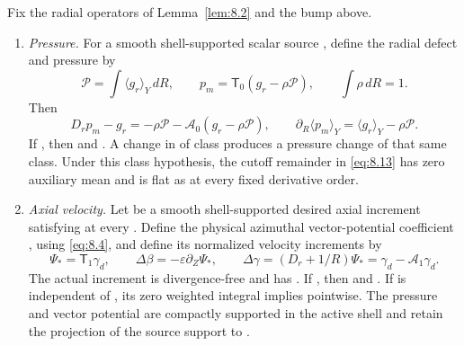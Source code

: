 \begin{proposition}\label{prop:8.3}
Fix the radial operators of Lemma~\ref{lem:8.2} and the bump  above.
%
\begin{enumerate}[label=(\roman*)]
\item \emph{Pressure.} For a smooth shell-supported scalar source
, define the radial defect 
and pressure  by
\begin{equation}
\mathcal P=\int\langle g_r\rangle_Y\,dR,
\qquad p_m=\mathsf T_0(g_r-\rho\mathcal P),
\qquad \int\rho\,dR=1.
\tag{8.12}\label{eq:8.12}
\end{equation}
Then
\begin{equation}
D_rp_m-g_r=-\rho\mathcal P-\mathcal A_0(g_r-\rho\mathcal P),
\qquad \partial_R\langle p_m\rangle_Y=\langle g_r\rangle_Y-\rho\mathcal P.
\tag{8.13}\label{eq:8.13}
\end{equation}
If , then
 and
. A change in  of class
 produces a pressure change of that same class. Under this
class hypothesis, the cutoff remainder in \eqref{eq:8.13} has zero auxiliary mean and is flat as
 at every fixed derivative order.

\item \emph{Axial velocity.} Let  be a smooth
shell-supported desired axial increment satisfying
 at every
. Define the physical azimuthal vector-potential coefficient
, using \eqref{eq:8.4},
and define its normalized velocity increments by
\begin{equation}
\Psi_*=\mathsf T_1\gamma_d,
\qquad \Delta\beta=-\varepsilon\partial_Z\Psi_*,
\qquad \Delta\gamma=(D_r+1/R)\Psi_*=\gamma_d-\mathcal A_1\gamma_d.
\tag{8.14}\label{eq:8.14}
\end{equation}
The actual increment  is divergence-free and
has . If
, then
 and
. If
 is independent of , its zero weighted
integral implies  pointwise. The pressure and vector
potential are compactly supported in the active shell and retain the projection of the source support
to .
\end{enumerate}
\end{proposition}

